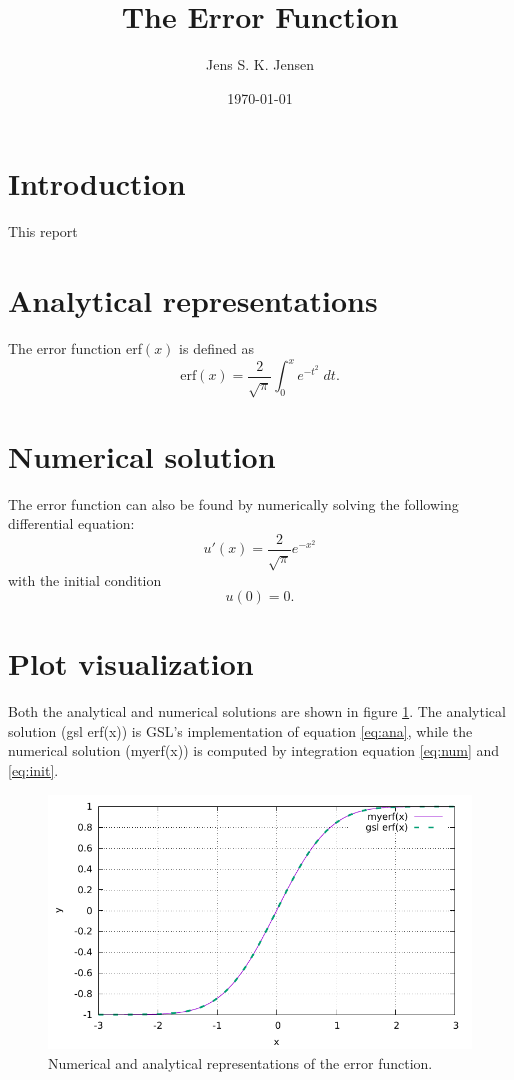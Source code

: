 \documentclass{article}
\begin{document}
\title{The Error Function}
\author{Jens S. K. Jensen}
\date{\today}
\maketitle

\section{Introduction}
This report 

\section{Analytical representations}
The error function erf$(x)$ is defined as
\begin{equation}
	\text{erf}(x) = \frac{2}{\sqrt{\pi}}\int_{0}^{x}e^{-t^2}\;dt.
	\label{eq:ana}
\end{equation}


\section{Numerical solution}
The error function can also be found by numerically solving the following differential equation:
\begin{equation}
	u'(x) = \frac{2}{\sqrt{\pi}}e^{-x^2}
	\label{eq:num}
\end{equation}
with the initial condition
\begin{equation}
	u(0) = 0.
	\label{eq:init}
\end{equation}

\section{Plot visualization}

Both the analytical and numerical solutions are shown in figure \ref{fig:plot}. The analytical solution (gsl erf(x)) is GSL's implementation of equation \ref{eq:ana}, while the numerical solution (myerf(x)) is computed by integration equation \ref{eq:num} and \ref{eq:init}.

\begin{figure}
	\centering
	\includegraphics{plot.pdf}
	\caption{Numerical and analytical representations of the error function.}
	\label{fig:plot}
\end{figure}
\end{document}
